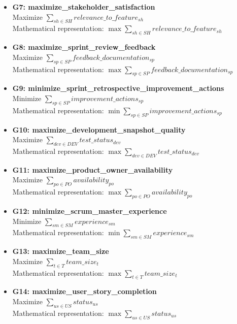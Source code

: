 \documentclass{article}
\begin{document}
\begin{itemize}
    \item \textbf{G7: maximize\_stakeholder\_satisfaction} \\
    Maximize $\sum_{sh \in SH} relevance\_to\_feature_{sh}$ \\
    Mathematical representation: $\max \sum_{sh \in SH} relevance\_to\_feature_{sh}$

    \item \textbf{G8: maximize\_sprint\_review\_feedback} \\
    Maximize $\sum_{sp \in SP} feedback\_documentation_{sp}$ \\
    Mathematical representation: $\max \sum_{sp \in SP} feedback\_documentation_{sp}$

    \item \textbf{G9: minimize\_sprint\_retrospective\_improvement\_actions} \\
    Minimize $\sum_{sp \in SP} improvement\_actions_{sp}$ \\
    Mathematical representation: $\min \sum_{sp \in SP} improvement\_actions_{sp}$

    \item \textbf{G10: maximize\_development\_snapshot\_quality} \\
    Maximize $\sum_{dev \in DEV} test\_status_{dev}$ \\
    Mathematical representation: $\max \sum_{dev \in DEV} test\_status_{dev}$

    \item \textbf{G11: maximize\_product\_owner\_availability} \\
    Maximize $\sum_{po \in PO} availability_{po}$ \\
    Mathematical representation: $\max \sum_{po \in PO} availability_{po}$

    \item \textbf{G12: minimize\_scrum\_master\_experience} \\
    Minimize $\sum_{sm \in SM} experience_{sm}$ \\
    Mathematical representation: $\min \sum_{sm \in SM} experience_{sm}$

    \item \textbf{G13: maximize\_team\_size} \\
    Maximize $\sum_{t \in T} team\_size_t$ \\
    Mathematical representation: $\max \sum_{t \in T} team\_size_t$

    \item \textbf{G14: maximize\_user\_story\_completion} \\
    Maximize $\sum_{us \in US} status_{us}$ \\
    Mathematical representation: $\max \sum_{us \in US} status_{us}$
\end{itemize}
\end{document}
